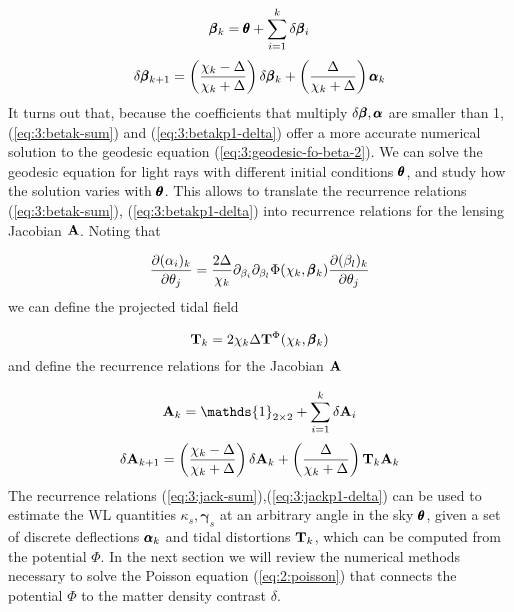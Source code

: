 \begin{equation}
\label{eq:3:betak-sum}
\pmb{\beta}_k = \pmb{\theta} + \sum_{i=1}^k\delta\pmb{\beta}_i
\end{equation}
%
\begin{equation}
\label{eq:3:betakp1-delta}
\delta\pmb{\beta}_{k+1} = \left(\frac{\chi_k-\Delta}{\chi_k+\Delta}\right)\delta\pmb{\beta}_k + \left(\frac{\Delta}{\chi_k+\Delta}\right)\pmb{\alpha}_k
\end{equation} 
%
It turns out that, because the coefficients that multiply $\delta\pmb{\beta},\pmb{\alpha}$ are smaller than 1, (\ref{eq:3:betak-sum}) and (\ref{eq:3:betakp1-delta}) offer a more accurate numerical solution to the geodesic equation (\ref{eq:3:geodesic-fo-beta-2}). We can solve the geodesic equation for light rays with different initial conditions $\pmb{\theta}$, and study how the solution varies with $\pmb{\theta}$. This allows to translate the recurrence relations (\ref{eq:3:betak-sum}), (\ref{eq:3:betakp1-delta}) into recurrence relations for the lensing Jacobian $\mathbf{A}$. Noting that 

\begin{equation}
\label{eq:3:Tk}
\frac{\partial (\alpha_i)_k}{\partial \theta_j} = \frac{2\Delta}{\chi_k}\partial_{\beta_i}\partial_{\beta_l}\Phi(\chi_k,\pmb{\beta}_k)\frac{\partial (\beta_l)_k}{\partial\theta_j}
\end{equation}
%
we can define the projected tidal field 

\begin{equation}
\label{eq:3:tidal-proj}
\mathbf{T}_k = 2\chi_k\Delta\mathbf{T}^\Phi(\chi_k,\pmb{\beta}_k) 
\end{equation}
%
and define the recurrence relations for the Jacobian $\mathbf{A}$

\begin{equation}
\label{eq:3:jack-sum}
\bb{A}_k = \mathds{1}_{2\times 2} + \sum_{i=1}^k\delta\bb{A}_i
\end{equation}
%
\begin{equation}
\label{eq:3:jackp1-delta}
\delta\mathbf{A}_{k+1} = \left(\frac{\chi_k-\Delta}{\chi_k+\Delta}\right)\delta\mathbf{A}_k + \left(\frac{\Delta}{\chi_k+\Delta}\right)\mathbf{T}_k\mathbf{A}_k
\end{equation} 
%
The recurrence relations (\ref{eq:3:jack-sum}),(\ref{eq:3:jackp1-delta}) can be used to estimate the WL quantities $\kappa_s,\pmb{\gamma}_s$ at an arbitrary angle in the sky $\pmb{\theta}$, given a set of discrete deflections $\pmb{\alpha}_k$ and tidal distortions $\mathbf{T}_k$, which can be computed from the potential $\Phi$. In the next section we will review the numerical methods necessary to solve the Poisson equation (\ref{eq:2:poisson}) that connects the potential $\Phi$ to the matter density contrast $\delta$. 

